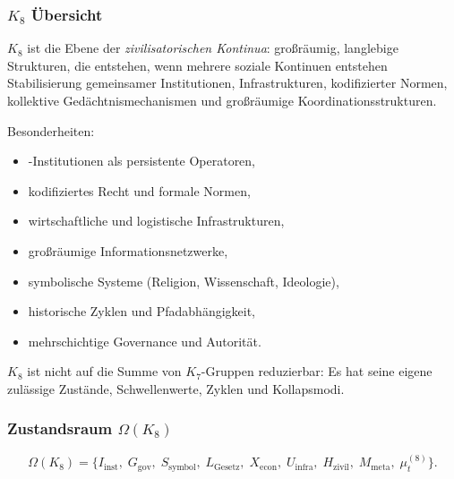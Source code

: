 

\subsubsection{\texorpdfstring{$K_8$}{K_8} Übersicht}
\label{sec:k8-overview}

$K_8$ ist die Ebene der \emph{zivilisatorischen Kontinua}: großräumig,
langlebige Strukturen, die entstehen, wenn mehrere soziale Kontinuen entstehen
Stabilisierung gemeinsamer Institutionen, Infrastrukturen, kodifizierter Normen,
kollektive Gedächtnismechanismen und großräumige Koordinationsstrukturen.

Besonderheiten:
\begin{itemize}
    \item-Institutionen als persistente Operatoren,
    \item kodifiziertes Recht und formale Normen,
    \item wirtschaftliche und logistische Infrastrukturen,
    \item großräumige Informationsnetzwerke,
    \item symbolische Systeme (Religion, Wissenschaft, Ideologie),
    \item historische Zyklen und Pfadabhängigkeit,
    \item mehrschichtige Governance und Autorität.
\end{itemize}

$K_8$ ist nicht auf die Summe von $K_7$-Gruppen reduzierbar: Es hat seine eigene
zulässige Zustände, Schwellenwerte, Zyklen und Kollapsmodi.

\subsubsection{Zustandsraum \texorpdfstring{$\Omega(K_8)$}{\Omega(K_8)}}

\[
\Omega(K_8)=
\{
I_{\mathrm{inst}},\;
G_{\mathrm{gov}},\;
S_{\mathrm{symbol}},\;
L_{\mathrm{Gesetz}},\;
X_{\mathrm{econ}},\;
U_{\mathrm{infra}},\;
H_{\mathrm{zivil}},\;
M_{\mathrm{meta}},\;
\mu^{(8)}_t
\}.
\]

